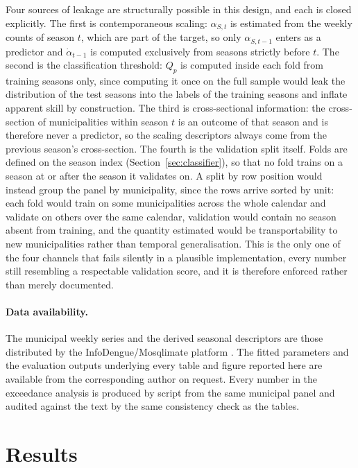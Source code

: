 \documentclass[english,10pt,b5paper]{article}
\begin{document}
Four sources of leakage are structurally possible in this design, and each is
closed explicitly. The first is contemporaneous scaling: $\alpha_{S,t}$ is
estimated from the weekly counts of season $t$, which are part of the target, so
only $\alpha_{S,t-1}$ enters as a predictor and $\dot\alpha_{t-1}$ is computed
exclusively from seasons strictly before $t$. The second is the classification
threshold: $Q_p$ is computed inside each fold from training seasons only, since
computing it once on the full sample would leak the distribution of the test
seasons into the labels of the training seasons and inflate apparent skill by
construction. The third is cross-sectional information: the cross-section of
municipalities within season $t$ is an outcome of that season and is therefore
never a predictor, so the scaling descriptors always come from the previous
season's cross-section. The fourth is the validation split itself. Folds are
defined on the season index (Section~\ref{sec:classifier}), so that no fold
trains on a season at or after the season it validates on. A split by row
position would instead group the panel by municipality, since the rows arrive
sorted by unit: each fold would train on some municipalities across the whole
calendar and validate on others over the same calendar, validation would contain
no season absent from training, and the quantity estimated would be
transportability to new municipalities rather than temporal generalisation. This
is the only one of the four channels that fails silently in a plausible
implementation, every number still resembling a respectable validation score,
and it is therefore enforced rather than merely documented.

\paragraph{Data availability.}
The municipal weekly series and the derived seasonal descriptors are those
distributed by the InfoDengue/Mosqlimate platform \citep{araujo2025large}. The
fitted parameters and the evaluation outputs underlying every table and figure
reported here are available from the corresponding author on request. Every number in
the exceedance analysis is produced by script from the same municipal panel and
audited against the text by the same consistency check as the tables.

\section{Results}
\label{sec:results}
\end{document}
